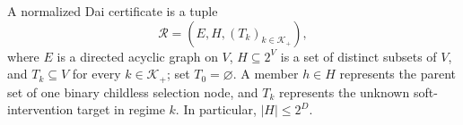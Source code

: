 A normalized Dai certificate is a tuple
\[
\mathcal R=(E,H,(T_k)_{k\in\mathcal K_+}),
\]
where \(E\) is a directed acyclic graph on \(V\), \(H\subseteq 2^V\) is a set of distinct subsets of \(V\), and \(T_k\subseteq V\) for every \(k\in\mathcal K_+\); set \(T_0=\varnothing\).  A member \(h\in H\) represents the parent set of one binary childless selection node, and \(T_k\) represents the unknown soft-intervention target in regime \(k\).  In particular, \(|H|\le 2^D\).